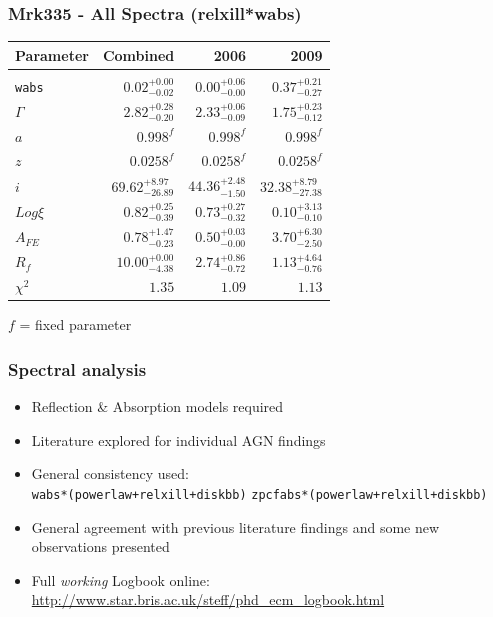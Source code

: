 \documentclass[]{beamer}
\begin{document}
\begin{frame}
\frametitle{Mrk335 - All Spectra (relxill*wabs)}
\begin{table}
    \begin{tabular}{lrrr}\vspace{0.2cm}
        Parameter & Combined & 2006 & 2009
        \\ \hline \\ 
        \texttt{wabs} & $0.02^{+0.00}_{-0.02}$  & $0.00^{+0.06}_{-0.00}$ & $0.37^{+0.21}_{-0.27}$ \\ [1ex] 
        $\Gamma$ & $2.82^{+0.28}_{-0.20}$ & $2.33^{+0.06}_{-0.09}$ & $1.75^{+0.23}_{-0.12}$\\ [1ex] 
        $a$ &  $0.998^{f}$ &  $0.998^{f}$ &  $0.998^{f}$ \\ [1ex] 
        $z$ &  $0.0258^{f}$ &  $0.0258^{f}$ &  $0.0258^{f}$ \\ [1ex] 
        $i$ &  $69.62^{+8.97}_{-26.89}$ &  $44.36^{+2.48}_{-1.50}$ &  $32.38^{+8.79}_{-27.38}$ \\[1ex] 
        $Log\xi$ &  $0.82^{+0.25}_{-0.39}$ &  $0.73^{+0.27}_{-0.32}$ &  $0.10^{+3.13}_{-0.10}$\\ [1ex] 
        $A_{FE}$ &  $0.78^{+1.47}_{-0.23}$ &  $0.50^{+0.03}_{-0.00}$ &  $3.70^{+6.30}_{-2.50}$\\ [1ex] 
        $R_f$ & $10.00^{+0.00}_{-4.38}$ & $2.74^{+0.86}_{-0.72}$ & $1.13^{+4.64}_{-0.76}$\\ [1ex] \hline  
        $\chi^2$ & $1.35$ & $1.09$ & $1.13$\\ \hline  
    \end{tabular}
\end{table}
$f$ = fixed parameter
\end{frame}

\begin{frame}
\frametitle{Spectral analysis}
\begin{itemize}
    \item Reflection \& Absorption models required \pause
    \item Literature explored for individual AGN findings \pause
    \item General consistency used:\\
    \texttt{wabs*(powerlaw+relxill+diskbb)} 
    \texttt{zpcfabs*(powerlaw+relxill+diskbb)}\pause
    \item General agreement with previous literature findings and some new observations presented\pause
    \item Full \textit{working} Logbook online:
    \url{http://www.star.bris.ac.uk/steff/phd_ecm_logbook.html}\p
    \end{itemize}
\end{frame}
\end{document}

